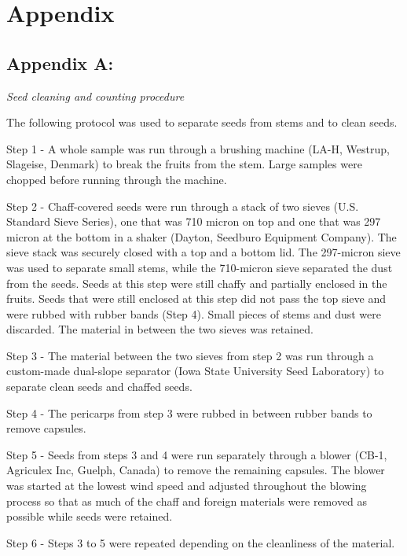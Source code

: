 \documentclass[
]{article}
\begin{document}
\hypertarget{appendix}{%
\section*{Appendix}\label{appendix}}

\hypertarget{appendix-a}{%
\subsection{Appendix A:}\label{appendix-a}}

\emph{Seed cleaning and counting procedure}

The following protocol was used to separate seeds from stems and to clean seeds.

Step 1 - A whole sample was run through a brushing machine (LA-H, Westrup, Slageise, Denmark) to break the fruits from the stem. Large samples were chopped before running through the machine.

Step 2 - Chaff-covered seeds were run through a stack of two sieves (U.S. Standard Sieve Series), one that was 710 micron on top and one that was 297 micron at the bottom in a shaker (Dayton, Seedburo Equipment Company). The sieve stack was securely closed with a top and a bottom lid. The 297-micron sieve was used to separate small stems, while the 710-micron sieve separated the dust from the seeds. Seeds at this step were still chaffy and partially enclosed in the fruits. Seeds that were still enclosed at this step did not pass the top sieve and were rubbed with rubber bands (Step 4). Small pieces of stems and dust were discarded. The material in between the two sieves was retained.

Step 3 - The material between the two sieves from step 2 was run through a custom-made dual-slope separator (Iowa State University Seed Laboratory) to separate clean seeds and chaffed seeds.

Step 4 - The pericarps from step 3 were rubbed in between rubber bands to remove capsules.

Step 5 - Seeds from steps 3 and 4 were run separately through a blower (CB-1, Agriculex Inc, Guelph, Canada) to remove the remaining capsules. The blower was started at the lowest wind speed and adjusted throughout the blowing process so that as much of the chaff and foreign materials were removed as possible while seeds were retained.

Step 6 - Steps 3 to 5 were repeated depending on the cleanliness of the material.
\end{document}
